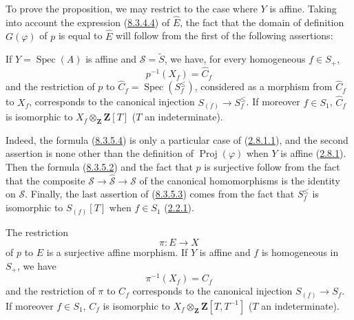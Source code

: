To prove the proposition, we may restrict to the case where $Y$ is affine.
Taking into account the expression (\hyperref[II.8.3.4.4]{8.3.4.4}) of
$\widehat{E}$, the fact that the domain of definition $G(\varphi)$ of $p$ is
equal to $\widehat{E}$ will follow from the first of the following assertions:

\begin{env}[8.3.5.3]
\label{II.8.3.5.3}
If $Y=\operatorname{Spec}(A)$ is affine and $\mathcal{S}=\widetilde{S}$, we
have, for every homogeneous $f\in S_+$,
\begin{equation}
\label{II.8.3.5.4}
  p^{-1}(X_f)=\widehat{C}_f
\tag{8.3.5.4}
\end{equation}
and the restriction of $p$ to
$\widehat{C}_f=\operatorname{Spec}(S_f^{\leq})$, considered as a morphism from
$\widehat{C}_f$ to $X_f$, corresponds to the canonical injection
$S_{(f)}\to S_f^{\leq}$. If moreover $f\in S_1$, $\widehat{C}_f$ is isomorphic
to $X_f\otimes_{\mathbf{Z}}\mathbf{Z}[T]$ ($T$ an indeterminate).
\end{env}

Indeed, the formula (\hyperref[II.8.3.5.4]{8.3.5.4}) is only a
particular case of (\hyperref[II.2.8.1.1]{2.8.1.1}), and the second assertion
is none other than the definition of $\operatorname{Proj}(\varphi)$ when $Y$
is affine (\hyperref[II.2.8.1]{2.8.1}). Then the formula
(\hyperref[II.8.3.5.2]{8.3.5.2}) and the fact that $p$ is surjective follow
from the fact that the composite $\mathcal{S}\to\widehat{\mathcal{S}}\to\mathcal{S}$ of the
canonical homomorphisms is the identity on $\mathcal{S}$. Finally, the
last assertion of (\hyperref[II.8.3.5.3]{8.3.5.3}) comes from the fact that
$S_f^{\leq}$ is isomorphic to $S_{(f)}[T]$ when $f\in S_1$
(\hyperref[II.2.2.1]{2.2.1}).

\begin{corollary}[8.3.6]
\label{II.8.3.6}
The restriction
\begin{equation}
\label{II.8.3.6.1}
  \pi:E\to X
\tag{8.3.6.1}
\end{equation}
of $p$ to $E$ is a surjective affine morphism. If $Y$ is affine and $f$ is
homogeneous in $S_+$, we have
\begin{equation}
\label{II.8.3.6.2}
  \pi^{-1}(X_f)=C_f
\tag{8.3.6.2}
\end{equation}
and the restriction of $\pi$ to $C_f$ corresponds to the canonical injection
$S_{(f)}\to S_f$. If moreover $f\in S_1$, $C_f$ is isomorphic to
$X_f\otimes_{\mathbf{Z}}\mathbf{Z}[T,T^{-1}]$ ($T$ an indeterminate).
\end{corollary}

